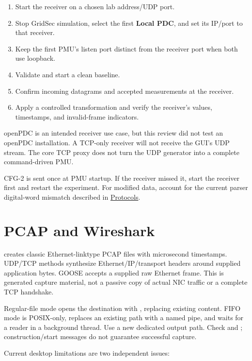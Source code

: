 \begin{enumerate}
\item Start the receiver on a chosen lab address/UDP port.
\item Stop GridSec simulation, select the first \textbf{Local PDC}, and set its IP/port to that receiver.
\item Keep the first PMU's listen port distinct from the receiver port when both use loopback.
\item Validate and start a clean baseline.
\item Confirm incoming datagrams and accepted measurements at the receiver.
\item Apply a controlled transformation and verify the receiver's values, timestamps, and invalid-frame indicators.
\end{enumerate}

openPDC is an intended receiver use case, but this review did not test an openPDC installation. A TCP-only receiver will not receive the GUI's UDP stream. The core TCP proxy does not turn the UDP generator into a complete command-driven PMU.

CFG-2 is sent once at PMU startup. If the receiver missed it, start the receiver first and restart the experiment. For modified data, account for the current parser digital-word mismatch described in \hyperref[chapter-7]{Protocols}.

\section*{PCAP and Wireshark}
 creates classic Ethernet-linktype PCAP files with microsecond timestamps. UDP/TCP methods synthesize Ethernet/IP/transport headers around supplied application bytes. GOOSE accepts a supplied raw Ethernet frame. This is generated capture material, not a passive copy of actual NIC traffic or a complete TCP handshake.

Regular-file mode opens the destination with , replacing existing content. FIFO mode is POSIX-only, replaces an existing path with a named pipe, and waits for a reader in a background thread. Use a new dedicated output path. Check  and ; construction/start messages do not guarantee successful capture.

Current desktop limitations are two independent issues:

